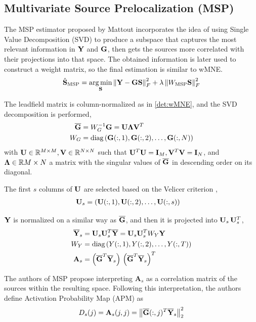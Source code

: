 \subsection{Multivariate Source Prelocalization (MSP)}

The MSP estimator proposed by Mattout \cite{mattout2005multivariate} incorporates the idea of using Single Value Decomposition (SVD) to produce a subspace that captures the most relevant information in $\mathbf{Y}$ and $\mathbf{G}$, then gets the sources more correlated with their projections into that space.
%
The obtained information is later used to construct a weight matrix, so the final estimation is similar to wMNE.
\begin{equation}
\hat{\mathbf{S}}_\text{MSP} = \operatorname*{arg\,min}_{\mathbf{S}} \left\lVert \mathbf{Y} - \mathbf{G} \mathbf{S} \right\rVert_F^2 + \lambda\left\lVert W_\text{MSP} \mathbf{S} \right\rVert_F^2
\end{equation}

The leadfield matrix is column-normalized as in \ref{det:wMNE}, and the SVD decomposition is performed, 
\begin{align}
\overline{\mathbf{G}} &= W_G^{-1} \mathbf{G} = \mathbf{U} \mathbf{\Lambda} \mathbf{V}^T
\\
W_G &= \text{diag}\left(   \mathbf{G}(:,1), \mathbf{G}(:,2), \dots, \mathbf{G}(:,N)   \right)
\end{align}
with $\mathbf{U}\in \mathbb{R}^{M\times M},\mathbf{V}\in \mathbb{R}^{N\times N}$ such that $\mathbf{U}^T \mathbf{U} = \mathbf{I}_M, \mathbf{V}^T\mathbf{V} = \mathbf{I}_N$, and $\mathbf{\Lambda} \in \mathbb{R}{M\times N}$ a matrix with the singular values of $\overline{\mathbf{G}}$ in descending order on its diagonal.

The first $s$ columns of $\mathbf{U}$ are selected based on the Velicer criterion \cite{velicer1996criterion},
\begin{align}
\mathbf{U}_s 
&= 
\left(  \mathbf{U}(:,1), \mathbf{U}(:,2), \dots, \mathbf{U}(:,s)  \right)
\end{align}

$\mathbf{Y}$ is normalized on a similar way as $\overline{\mathbf{G}}$, and then it is projected into $\mathbf{U}_s\, \mathbf{U}_s^T$,
\begin{align}
\overline{\mathbf{Y}}_s 
&=
\mathbf{U}_s \mathbf{U}_s^T \overline{\mathbf{Y}} = \mathbf{U}_s \mathbf{U}_s^T W_Y \mathbf{Y}
\\
W_Y &= \text{diag}\left(   Y(:,1), Y(:,2), \dots, Y(:,T)   \right)
\\
\mathbf{A}_s &= \left( \overline{\mathbf{G}}^T \overline{\mathbf{Y}}_s \right)\, \left( \overline{\mathbf{G}}^T \overline{\mathbf{Y}}_s \right)^T
\end{align}

The authors of MSP propose interpreting $\mathbf{A}_s$ as a correlation matrix of the sources within the resulting space.
%
Following this interpretation, the authors define {Activation Probability Map} (APM) as
\begin{align}
{D}_s(j) = \mathbf{A}_s(j,j) = \left\lVert \overline{\mathbf{G}}(:,j)^T \overline{\mathbf{Y}}_s   \right\rVert_2^2
\end{align}

